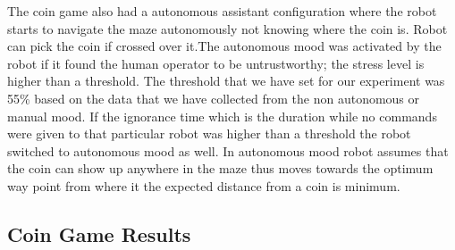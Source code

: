 \documentclass{sig-alternate}
\begin{document}
The coin game also had a autonomous assistant configuration where the robot starts to navigate the maze autonomously not knowing where the coin is. Robot can pick the coin if crossed over it.The autonomous mood was activated by the robot if it found the human operator to be untrustworthy; the stress level is higher than a threshold. The threshold that we have set for our experiment was 55\% based on the data that we have collected from the non autonomous or manual mood. If the ignorance time which is the duration while no commands were given to that particular robot was higher than a threshold the robot switched to autonomous mood as well. In autonomous mood robot assumes that the coin can show up anywhere in the maze thus moves towards the optimum way point from where it the expected distance from a coin is minimum. 

\subsection{Coin Game Results}
\end{document}
